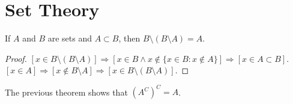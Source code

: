     \section{Set Theory}
        \begin{theorem}
            If $A$ and $B$ are sets and $A\subset B$,
            then $B\setminus(B\setminus A)=A$.
        \end{theorem}
        \begin{proof}
            $[x\in B\setminus(B\setminus{A})]%
             \Rightarrow[x\in{B}\land{x}\notin%
             \{x\in{B}:x\notin{A}\}]%
             \Rightarrow[x\in{A}\subset{B}]$.
             $[x\in{A}]\Rightarrow[x\notin{B}\setminus{A}]%
             \Rightarrow[x\in{B}\setminus(B\setminus{A})]$.
        \end{proof}
        The previous theorem shows that $(A^C)^{C}=A$.

